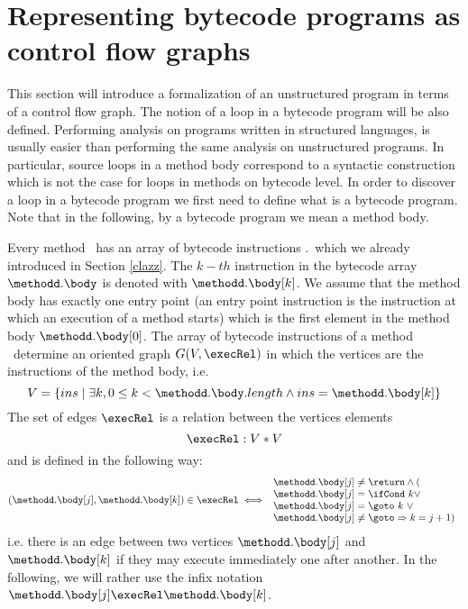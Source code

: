 
\section{Representing bytecode programs as control flow graphs}\label{prelim}

This section will introduce a formalization of an unstructured program in terms of a control flow graph.
The notion of a loop in a bytecode program will be also defined.
Performing analysis on programs written in  structured languages, is usually easier than performing the same analysis 
on unstructured programs. In particular, source loops in a method body correspond to a syntactic construction which is not the 
case for loops in methods on bytecode level. In order to discover a loop in a bytecode program we first need to define 
what is a bytecode program. Note that in the following, by a  bytecode program we mean a method body.

Every method \methodd \ has an array of bytecode instructions \method.\body \  which we already introduced in Section \ref{clazz}.
The $k-th$ instruction in the bytecode array $\methodd.\body$ is  denoted with $\methodd.\body[k]$.
 We assume that the method body has exactly one entry point
 (an entry point instruction is the instruction at which an execution of a method starts) which is the first
 element in the method body
$\methodd.\body[0]$.
The array of bytecode instructions of a method \methodd \ determine an oriented graph $G( V , \execRel ) $ in which the vertices are the instructions of the method body,
i.e. $$ V = \{ ins \mid \exists k,  0 \leq k < \methodd.\body.length \wedge ins = \methodd.\body[k] \}$$
The set of edges $\execRel$ is a relation between the vertices elements
$$ \execRel : V * V $$ and is defined  in the following way:
$$ (\methodd.\body[j], \methodd.\body[k]) \in \execRel \iff 
   \begin{array}{l} \methodd.\body[j] \neq \return \wedge( \\
                    \methodd.\body[j] = \ifCond \ k \vee \\
		    \methodd.\body[j] = \goto \ k \ \vee \\
		    \methodd.\body[j] \neq \goto \Rightarrow  k = j+1)
   \end{array}$$
 i.e. there is an edge between two vertices $\methodd.\body[j]$ and  $\methodd.\body[k]$ if they may execute immediately one after another.
In the following, we will rather use the infix notation $\methodd.\body[j] \execRel \methodd.\body[k]$.


